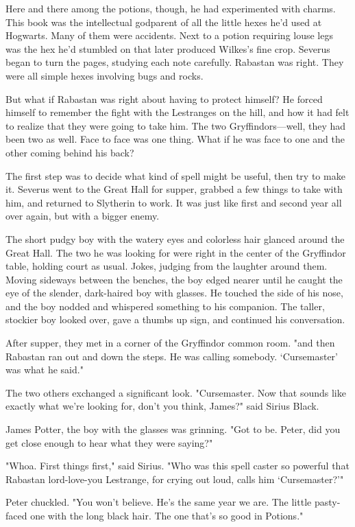 Here and there among the potions, though, he had experimented with charms. This book was the intellectual godparent of all the little hexes he'd used at Hogwarts. Many of them were accidents. Next to a potion requiring louse legs was the hex he'd stumbled on that later produced Wilkes's fine crop. Severus began to turn the pages, studying each note carefully. Rabastan was right. They were all simple hexes involving bugs and rocks.

But what if Rabastan was right about having to protect himself? He forced himself to remember the fight with the Lestranges on the hill, and how it had felt to realize that they were going to take him. The two Gryffindors—well, they had been two as well. Face to face was one thing. What if he was face to one and the other coming behind his back?

The first step was to decide what kind of spell might be useful, then try to make it. Severus went to the Great Hall for supper, grabbed a few things to take with him, and returned to Slytherin to work. It was just like first and second year all over again, but with a bigger enemy.

The short pudgy boy with the watery eyes and colorless hair glanced around the Great Hall. The two he was looking for were right in the center of the Gryffindor table, holding court as usual. Jokes, judging from the laughter around them. Moving sideways between the benches, the boy edged nearer until he caught the eye of the slender, dark-haired boy with glasses. He touched the side of his nose, and the boy nodded and whispered something to his companion. The taller, stockier boy looked over, gave a thumbs up sign, and continued his conversation.

After supper, they met in a corner of the Gryffindor common room. "{\el}and then Rabastan ran out and down the steps. He was calling somebody. `Cursemaster' was what he said."

The two others exchanged a significant look. "Cursemaster. Now that sounds like exactly what we're looking for, don't you think, James?" said Sirius Black.

James Potter, the boy with the glasses was grinning. "Got to be. Peter, did you get close enough to hear what they were saying?"

"Whoa. First things first," said Sirius. "Who was this spell caster so powerful that Rabastan lord-love-you Lestrange, for crying out loud, calls him `Cursemaster?'"

Peter chuckled. "You won't believe. He's the same year we are. The little pasty-faced one with the long black hair. The one that's so good in Potions."

